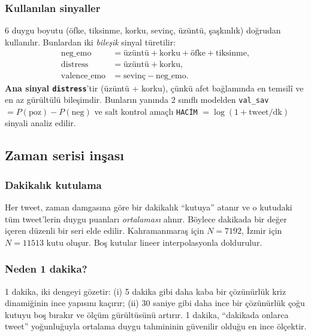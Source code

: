 \documentclass[11pt,a4paper]{article}
\begin{document}
\subsubsection{Kullanılan sinyaller}
6 duygu boyutu (öfke, tiksinme, korku, sevinç, üzüntü, şaşkınlık) doğrudan
kullanılır. Bunlardan iki \emph{bileşik} sinyal türetilir:
\begin{align}
  \text{neg\_emo} &= \text{üzüntü} + \text{korku} + \text{öfke} + \text{tiksinme},\\
  \text{distress} &= \text{üzüntü} + \text{korku},\\
  \text{valence\_emo} &= \text{sevinç} - \text{neg\_emo}.
\end{align}
\textbf{Ana sinyal \texttt{distress}}'tir (üzüntü + korku), çünkü afet
bağlamında en temsilî ve en az gürültülü bileşimdir. Bunların yanında
2 sınıflı modelden \texttt{val\_sav} $= P(\text{poz}) - P(\text{neg})$ ve
salt kontrol amaçlı \texttt{HACİM} $= \log(1+\text{tweet/dk})$ sinyali analiz
edilir.

\subsection{Zaman serisi inşası}

\subsubsection{Dakikalık kutulama}
Her tweet, zaman damgasına göre bir dakikalık ``kutuya'' atanır ve o kutudaki
tüm tweet'lerin duygu puanları \emph{ortalaması} alınır. Böylece dakikada bir
değer içeren düzenli bir seri elde edilir. Kahramanmaraş için $N=7192$,
İzmir için $N=11513$ kutu oluşur. Boş kutular lineer interpolasyonla
doldurulur.

\subsubsection{Neden 1 dakika?}
1 dakika, iki dengeyi gözetir: (i) 5 dakika gibi daha kaba bir çözünürlük kriz
dinamiğinin ince yapısını kaçırır; (ii) 30 saniye gibi daha ince bir çözünürlük
çoğu kutuyu boş bırakır ve ölçüm gürültüsünü artırır. 1 dakika, ``dakikada
onlarca tweet'' yoğunluğuyla ortalama duygu tahmininin güvenilir olduğu en
ince ölçektir.
\end{document}
